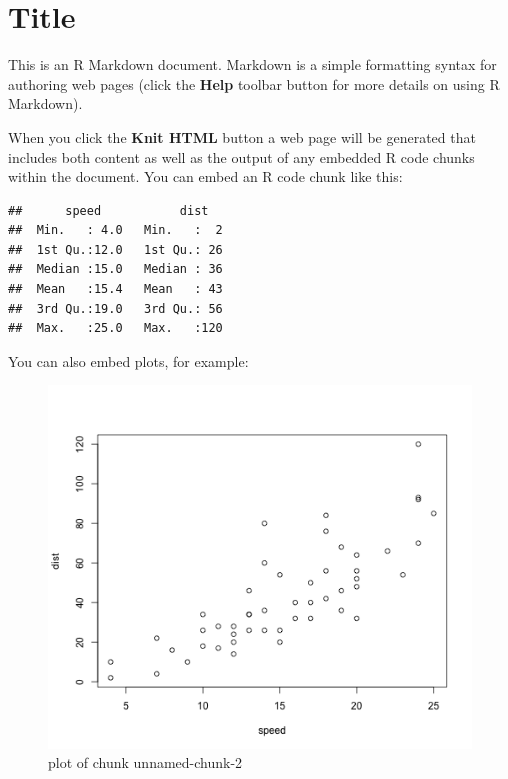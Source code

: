 \section{Title}

This is an R Markdown document. Markdown is a simple formatting syntax
for authoring web pages (click the \textbf{Help} toolbar button for more
details on using R Markdown).

When you click the \textbf{Knit HTML} button a web page will be
generated that includes both content as well as the output of any
embedded R code chunks within the document. You can embed an R code
chunk like this:

\begin{Shaded}
\begin{Highlighting}[]
\end{Highlighting}
\end{Shaded}

\begin{verbatim}
##      speed           dist    
##  Min.   : 4.0   Min.   :  2  
##  1st Qu.:12.0   1st Qu.: 26  
##  Median :15.0   Median : 36  
##  Mean   :15.4   Mean   : 43  
##  3rd Qu.:19.0   3rd Qu.: 56  
##  Max.   :25.0   Max.   :120
\end{verbatim}

You can also embed plots, for example:

\begin{Shaded}
\begin{Highlighting}[]
\end{Highlighting}
\end{Shaded}

\begin{figure}[htbp]
\centering
\includegraphics{figure/unnamed-chunk-2.png}
\caption{plot of chunk unnamed-chunk-2}
\end{figure}
